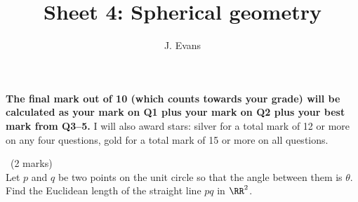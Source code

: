 \documentclass[12pt]{article}
\title{Sheet 4: Spherical geometry}
\author{J. Evans}
\date{}
\begin{document}
\maketitle

\bigskip

{\bf The final mark out of 10 (which counts towards your grade) will be calculated as your mark on Q1 plus your mark on Q2 plus your best mark from Q3--5.} I will also award stars: silver for a total mark of 12 or more on any four questions, gold for a total mark of 15 or more on all questions.

\vspace{1cm}

\begin{question}\ (2 marks)\\
Let $p$ and $q$ be two points on the unit circle so that the angle between them is $\theta$. Find the Euclidean length of the straight line $pq$ in $\RR^2$.
\end{question}

\iffalse
\begin{answer}
  Drop a perpendicular bisector to turn the triangle $0pq$ into two right-angled triangles each with base $\sin(\theta/2)$. The chord then has length $2\sin(\theta/2)$.
\end{answer}
\newpage
\fi

\vspace{1cm}
\end{document}
